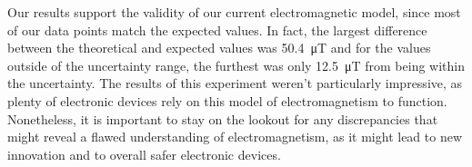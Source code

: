 Our results support the validity of our current electromagnetic model, since most of our data points match the expected values. In fact, the largest difference between the theoretical and expected values was \SI{50.4}{\micro\tesla} and for the values outside of the uncertainty range, the furthest was only \SI{12.5}{\micro\tesla} from being within the uncertainty. The results of this experiment weren't particularly impressive, as plenty of electronic devices rely on this model of electromagnetism to function. Nonetheless, it is important to stay on the lookout for any discrepancies that might reveal a flawed understanding of electromagnetism, as it might lead to new innovation and to overall safer electronic devices.